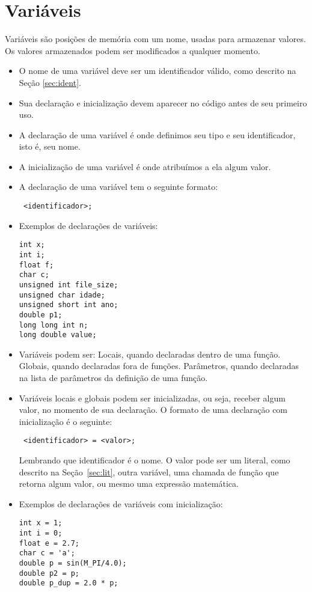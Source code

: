 \documentclass{book}
\begin{document}

\section{Variáveis}

Variáveis são posições de memória com um nome, usadas para armazenar valores. Os valores armazenados podem ser modificados a qualquer momento.

\begin{itemize}
\item O nome de uma variável deve ser um identificador válido, como descrito na Seção \ref{sec:ident}.
\item Sua declaração e inicialização devem aparecer no código antes de seu primeiro uso.
\item A declaração de uma variável é onde definimos seu tipo e seu identificador, isto é, seu nome.
\item A inicialização de uma variável é onde atribuímos a ela algum valor.
\item A declaração de uma variável tem o seguinte formato:

{\tt <tipo de dados> <identificador>;}

\item Exemplos de declarações de variáveis:
\begin{lstlisting}
int x;
int i;
float f;
char c;
unsigned int file_size;
unsigned char idade;
unsigned short int ano;
double p1;
long long int n;
long double value;
\end{lstlisting}


\item Variáveis podem ser:
\subitem Locais, quando declaradas dentro de uma função.
\subitem Globais, quando declaradas fora de funções.
\subitem Parâmetros, quando declaradas na lista de parâmetros da definição de uma função.

\item Variáveis locais e globais podem ser inicializadas, ou seja, receber algum valor, no momento de sua declaração. O formato de uma declaração com inicialização é o seguinte:

{\tt <tipo de dados> <identificador> = <valor>;}

Lembrando que identificador é o nome. O valor pode ser um literal, como descrito na Seção~\ref{sec:lit}, outra variável, uma chamada de função que retorna algum valor, ou mesmo uma expressão matemática.

\item Exemplos de declarações de variáveis com inicialização:
\begin{lstlisting}
int x = 1;
int i = 0;
float e = 2.7;
char c = 'a';
double p = sin(M_PI/4.0);
double p2 = p;
double p_dup = 2.0 * p;
\end{lstlisting}

\end{itemize}
\end{document}
